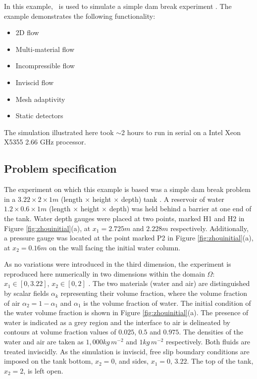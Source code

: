 In this example, \fluidity\ is used to simulate a simple dam break experiment \citep{zhou_nonlinear_1999}.  The example demonstrates the following functionality:

\begin{itemize}
\item 2D flow
\item Multi-material flow
\item Incompressible flow
\item Inviscid flow
\item Mesh adaptivity
\item Static detectors
\end{itemize}

The simulation illustrated here took $\sim$2 hours to run in serial on a Intel Xeon X5355 2.66 GHz processor.

\subsection{Problem specification}
The experiment on which this example is based was a simple dam break problem in a $3.22\times2\times1m$ (length $\times$ height $\times$ depth) tank \citep{zhou_nonlinear_1999}.  A reservoir of water $1.2\times0.6\times1m$ (length $\times$ height $\times$ depth) was held behind a barrier at one end of the tank.  Water depth gauges were placed at two points, marked H1 and H2 in Figure \ref{fig:zhouinitial}(a), at $x_1 = 2.725m$ and $2.228m$ respectively.  Additionally, a pressure gauge was located at the point marked P2 in Figure \ref{fig:zhouinitial}(a), at $x_2=0.16m$ on the wall facing the initial water column.

As no variations were introduced in the third dimension, the experiment is reproduced here numerically in two dimensions within the domain $\Omega$: $x_1 \in [0,3.22]$, $x_2 \in [0,2]$ \citep{lee_numerical_2002, colagrossi_numerical_2003, park_volume-of-fluid_2009}.  The two materials (water and air) are distinguished by scalar fields $\alpha_k$ representing their volume fraction, where the volume fraction of air $\alpha_2 = 1-\alpha_1$ and $\alpha_1$ is the volume fraction of water. The initial condition of the water volume fraction is shown in Figure \ref{fig:zhouinitial}(a).  The presence of water is indicated as a grey region and the interface to air is delineated by contours at volume fraction values of $0.025$, $0.5$ and $0.975$.  The densities of the water and air are taken as $ 1,000kg\,m^{-2}$ and $1kg\,m^{-2}$ respectively.  Both fluids are treated inviscidly. As the simulation is inviscid, free slip boundary conditions are imposed on the tank bottom, $x_2=0$, and sides, $x_1=0,\,3.22$.  The top of the tank, $x_2=2$, is left open.

